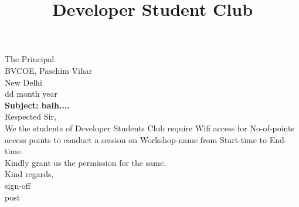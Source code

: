 \documentclass[12pt,a4paper]{article} %
\title{Developer Student Club}
\begin{document}
	
	
	\date{}
	\maketitle
	\hspace{-8mm}
	The Principal \\
	BVCOE, Paschim Vihar\\
	New Delhi\\
	\linebreak
	dd month year\\
	\linebreak
	\textbf{Subject: balh....}\\
	\linebreak
	Respected Sir,\\
	
	\vspace{-5mm}
	\hspace{8mm}
	We the students of Developer Students Club require Wifi access for
	No-of-points
	access points to conduct a session on 
	Workshop-name 
	from 
	Start-time 
	to 
	End-time.\\
	Kindly grant us the permission for the same. \\
	\linebreak
	Kind regards,\\
	sign-off\\
	post 
	
\end{document}
